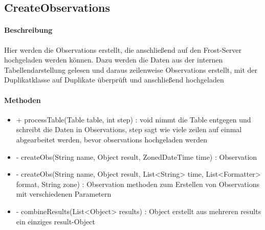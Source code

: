 \subsection{CreateObservations}

\paragraph{Beschreibung}
Hier werden die Observations erstellt, die anschließend auf den Frost-Server hochgeladen werden können.
Dazu werden die Daten aus der internen Tabellendarstellung gelesen und daraus zeilenweise Observations erstellt, mit der Duplikatklasse auf Duplikate überprüft und anschließend hochgeladen



\paragraph{Methoden}

\begin{itemize}
\item + processTable(Table table, int step) : void
nimmt die Table entgegen und schreibt die Daten in Observations, step sagt wie viele zeilen auf einmal abgearbeitet werden, bevor observations hochgeladen werden
\item - createObs(String name, Object result, ZonedDateTime time) : Observation
\item - createObs(String name, Object result, List<String> time, List<Formatter> format, String zone) : Observation
methoden zum Erstellen von Observations mit verschiedenen Parametern
\item - combineResults(List<Object> results) : Object
erstellt aus mehreren results ein einziges result-Object
\end{itemize}